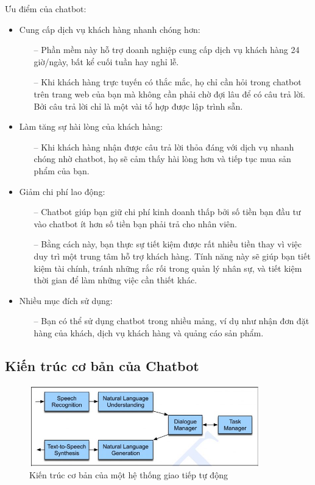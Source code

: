 Ưu điểm của chatbot:
\begin{itemize}
    \item Cung cấp dịch vụ khách hàng nhanh chóng hơn:
          \begin{itemize}
              \item[--] Phần mềm này hỗ trợ doanh nghiệp cung cấp dịch vụ khách hàng 24 giờ/ngày, bất kể cuối tuần hay nghỉ lễ.
              \item[--] Khi khách hàng trực tuyến có thắc mắc, họ chỉ cần hỏi trong chatbot trên trang web của bạn mà không cần phải chờ đợi lâu để có câu trả lời. Bởi câu trả lời chỉ là một vài tổ hợp được lập trình sẵn.
          \end{itemize}
    \item Làm tăng sự hài lòng của khách hàng:
          \begin{itemize}
              \item[--] Khi khách hàng nhận được câu trả lời thỏa đáng với dịch vụ nhanh chóng nhờ chatbot, họ sẽ cảm thấy hài lòng hơn và tiếp tục mua sản phẩm của bạn.
          \end{itemize}
    \item Giảm chi phí lao động:
          \begin{itemize}
              \item[--] Chatbot giúp bạn giữ chi phí kinh doanh thấp bởi số tiền bạn đầu tư vào chatbot ít hơn số tiền bạn phải trả cho nhân viên.
              \item[--] Bằng cách này, bạn thực sự tiết kiệm được rất nhiều tiền thay vì việc duy trì một trung tâm hỗ trợ khách hàng. Tính năng này sẽ giúp bạn tiết kiệm tài chính, tránh những rắc rối trong quản lý nhân sự, và tiết kiệm thời gian để làm những việc cần thiết khác.
          \end{itemize}
    \item Nhiều mục đích sử dụng:
          \begin{itemize}
              \item[--] Bạn có thể sử dụng chatbot trong nhiều mảng, ví dụ như nhận đơn đặt hàng của khách, dịch vụ khách hàng và quảng cáo sản phẩm.
          \end{itemize}
\end{itemize}
\subsection{Kiến trúc cơ bản của Chatbot}
\begin{figure}[htp]
    \centering
    \includegraphics[width=10cm]{images/k.jpg}
    \caption{Kiến trúc cơ bản của một hệ thống giao tiếp tự động}
    \label{fig:k}
\end{figure}

